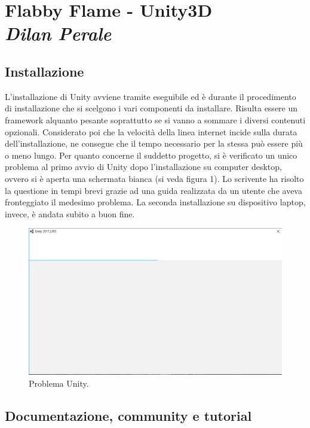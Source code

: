 
\newpage
\section{Flabby Flame - Unity3D\\{\small \emph{Dilan Perale}}}
\label{sec:unity}

\subsection{Installazione}

L’installazione di Unity avviene tramite eseguibile ed è durante il procedimento di installazione che si scelgono i vari componenti da installare. Risulta essere un framework alquanto pesante soprattutto se si vanno a sommare i diversi contenuti opzionali. Considerato poi che la velocità della linea internet incide sulla durata dell’installazione, ne consegue che il tempo necessario per la stessa può essere più o meno lungo.
Per quanto concerne il suddetto progetto, si è verificato un unico problema al primo avvio di Unity dopo l’installazione su computer desktop, ovvero si è aperta una schermata bianca (si veda figura 1). Lo scrivente ha risolto la questione in tempi brevi grazie ad una guida realizzata da un utente che aveva fronteggiato il medesimo problema. La seconda installazione su dispositivo laptop, invece, è andata subito a buon fine.

\begin{figure}[h]
\centering
\includegraphics [width=\textwidth]{img/unity_problem.png}
\caption{\label{fig:problem} Problema Unity.}
\end{figure}

\subsection{Documentazione, community e tutorial}

